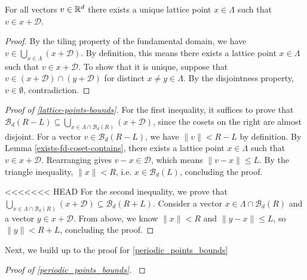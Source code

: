 \begin{lemma}\label{exists-fd-coset-contains}\lean{}
  For all vectors $v \in \mathbb{R}^d$ there exists a unique lattice point $x \in \Lambda$ such that $v \in x + \mathcal{D}$.
\end{lemma}
\begin{proof}
  By the tiling property of the fundamental domain, we have $v \in \bigcup_{x \in \Lambda} (x + \mathcal{D})$. By definition, this means there exists a lattice point $x \in \Lambda$ such that $v \in x + \mathcal{D}$. To show that it is unique, suppose that $v \in (x + \mathcal{D}) \cap (y + \mathcal{D})$ for distinct $x \neq y \in \Lambda$. By the disjointness property, $v \in \emptyset$, contradiction.
\end{proof}

\begin{proof}[Proof of \cref{lattice-points-bounds}]\label{lattice-points-bounds-proof}
  For the first inequality, it suffices to prove that $\mathcal{B}_d(R - L) \subseteq \bigcup_{x \in \Lambda \cap \mathcal{B}_d(R)} (x + \mathcal{D})$, since the cosets on the right are almost disjoint. For a vector $v \in \mathcal{B}_d(R - L)$, we have $\|v\| < R - L$ by definition. By Lemma \cref{exists-fd-coset-contains}, there exists a lattice point $x \in \Lambda$ such that $v \in x + \mathcal{D}$. Rearranging gives $v - x \in \mathcal{D}$, which means $\|v - x\| \leq L$. By the triangle inequality, $\|x\| < R$, i.e. $x \in \mathcal{B}_d(L)$, concluding the proof.

<<<<<<< HEAD
  For the second inequality, we prove that $\bigcup_{x \in \Lambda \cap \mathcal{B}_d(R)} (x + \mathcal{D}) \subseteq \mathcal{B}_d(R + L)$. Consider a vector $x \in \Lambda \cap \mathcal{B}_d(R)$ and a vector $y \in x + \mathcal{D}$. From above, we know $\|x\| < R$ and $\|y - x\| \leq L$, so $\|y\| < R + L$, concluding the proof.
\end{proof}

Next, we build up to the proof for \cref{periodic_points_bounds}

\begin{definition}\label{periodic_quot_lattice_def}
\end{definition}

\begin{proof}[Proof of \cref{periodic_points_bounds}]\label{periodic_points_bounds_proof}\leanok
\end{proof}
